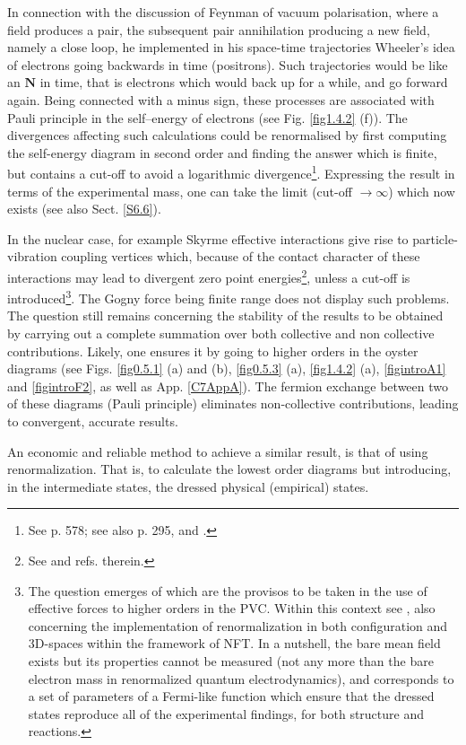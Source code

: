\begin{subappendices}
 In connection with the discussion of Feynman of vacuum polarisation, where a field produces a pair,
 the subsequent pair annihilation producing a new field, namely a close loop, he implemented in his space-time trajectories 
 Wheeler's idea of electrons going backwards in time (positrons).  Such trajectories would be like an $\mathbf N$ in time,
 that is electrons which would back up for a while, and go forward again. Being connected 
 with a minus sign, these processes are associated with Pauli principle in the self--energy of electrons
 (see Fig. \ref{fig1.4.2} (f)). 
 The divergences affecting
 such calculations  could be renormalised by first computing the self-energy  diagram in second order and finding the answer which is finite, but contains a cut-off
 to avoid a logarithmic divergence\footnote{See \cite{Bethe:47,Feynman:61b,Weinberg:96} p. 578; see also \cite{Mehra:96} p. 295, and \cite{Bjorken:98}.}. Expressing the result in terms of the experimental mass, one can take 
 the limit (cut-off $\to \infty$) which now exists (see also Sect. \ref{S6.6}).
  
 In the nuclear case, for example Skyrme effective interactions give 
 rise to particle-vibration coupling vertices which, because of the contact character of these interactions 
 may lead to divergent zero point energies\footnote{See \cite{Hellemans:13,Pastore:15} and refs. therein.}, unless a cut-off is introduced\footnote{The question emerges of which are the provisos to be taken in the use of effective forces to higher orders in the PVC. Within this context see \cite{Mahaux:85}, also \cite{Broglia:16,Barranco:17} concerning the implementation of renormalization in both configuration and 3D-spaces within the framework of NFT. In a nutshell, the bare mean field exists but its properties cannot be measured (not any more than the bare electron mass in renormalized quantum electrodynamics), and corresponds to a set of parameters of a Fermi-like function which ensure that the dressed states reproduce all of the experimental findings, for both structure and reactions.}.
 The Gogny force being finite range does not display such problems. The question still remains concerning the stability of the results to be obtained by carrying out a complete summation over both collective and non collective contributions. 
 Likely, one ensures it   by going to higher orders in the oyster diagrams (see Figs. \ref{fig0.5.1} (a) and (b), \ref{fig0.5.3} (a),  \ref{fig1.4.2} (a), \ref{figintroA1} and \ref{figintroF2}, as well as App. \ref{C7AppA}). 
 The fermion exchange between two of these diagrams (Pauli principle)  eliminates  non-collective
 contributions, leading to convergent, accurate results.
 
 An economic and reliable method to achieve a similar result, 
 is that of using renormalization. That is, to calculate the lowest order diagrams 
 but introducing, in the intermediate states, the dressed physical (empirical) states.
 
 


\end{subappendices}


